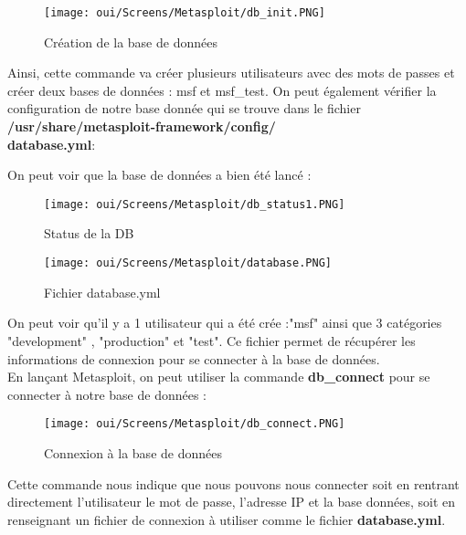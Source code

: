 \begin{figure}[htp!]
  \centering
  \setlength\figureheight{7cm}
  \setlength\figurewidth{9cm}
  \texttt{[image: oui/Screens/Metasploit/db\_init.PNG]}
  \caption{Création de la base de données}
  \label{fig:courbe-tikz}
\end{figure}

Ainsi, cette commande va créer plusieurs utilisateurs avec des mots de passes et créer deux bases de données : msf et msf\_test. On peut également vérifier la configuration de notre base donnée qui se trouve dans le fichier \textbf{/usr/share/metasploit-framework/config/ \\ database.yml}:

\noindent On peut voir que la base de données a bien été lancé :

\begin{figure}[htp!]
  \centering
  \setlength\figureheight{7cm}
  \setlength\figurewidth{9cm}
  \texttt{[image: oui/Screens/Metasploit/db\_status1.PNG]}
  \caption{Status de la DB}
  \label{fig:courbe-tikz}
\end{figure}

\begin{figure}[htp!]
  \centering
  \setlength\figureheight{7cm}
  \setlength\figurewidth{9cm}
  \texttt{[image: oui/Screens/Metasploit/database.PNG]}
  \caption{Fichier database.yml}
  \label{fig:courbe-tikz}
\end{figure}
\noindent On peut voir qu'il y a 1 utilisateur qui a été crée :"msf" ainsi que 3 catégories "development" , "production" et "test". Ce fichier permet de récupérer les informations de connexion pour se connecter à la base de données.\\

\noindent En lançant Metasploit, on peut utiliser la commande \textbf{db\_connect} pour se connecter à notre base de données :

\begin{figure}[htp!]
  \centering
  \setlength\figureheight{7cm}
  \setlength\figurewidth{9cm}
  \texttt{[image: oui/Screens/Metasploit/db\_connect.PNG]}
  \caption{Connexion à la base de données}
  \label{fig:courbe-tikz}
\end{figure}
\noindent Cette commande nous indique que nous pouvons nous connecter soit en rentrant directement l'utilisateur le mot de passe, l'adresse IP et la base données, soit en renseignant un fichier de connexion à utiliser comme le fichier \textbf{database.yml}.\\

